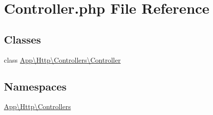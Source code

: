 \hypertarget{_controller_8php}{}\section{Controller.\+php File Reference}
\label{_controller_8php}
\subsection*{Classes}
\begin{DoxyCompactItemize}
\item 
class \mbox{\hyperlink{class_app_1_1_http_1_1_controllers_1_1_controller}{App\textbackslash{}\+Http\textbackslash{}\+Controllers\textbackslash{}\+Controller}}
\end{DoxyCompactItemize}
\subsection*{Namespaces}
\begin{DoxyCompactItemize}
\item 
 \mbox{\hyperlink{namespace_app_1_1_http_1_1_controllers}{App\textbackslash{}\+Http\textbackslash{}\+Controllers}}
\end{DoxyCompactItemize}
